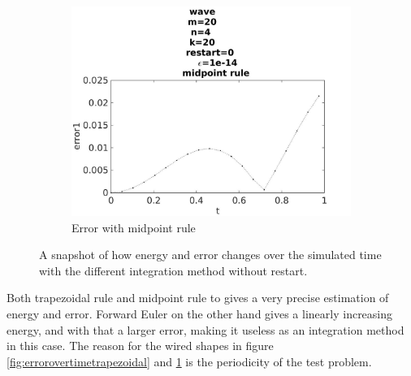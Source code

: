 \begin{figure}[H]
\begin{subfigure}[b]{0.30\textwidth}
                \includegraphics[width=\textwidth]{../MATLAB/fig/errorovertimemidpoint.jpg}
                \caption{ Error with midpoint rule }
                \label{fig:errorovertimemidpoint}
        \end{subfigure}
        \caption{A snapshot of how energy and error changes over the simulated time with the different integration method without restart.}
        \label{fig:error}
\end{figure}
Both trapezoidal rule and midpoint rule to gives a very precise estimation of energy and error. Forward Euler on the other hand gives a linearly increasing energy, and with that a larger error, making it useless as an integration method in this case. The reason for the wired shapes in figure \ref{fig:errorovertimetrapezoidal} and \ref{fig:errorovertimemidpoint} is the periodicity of the test problem. 
